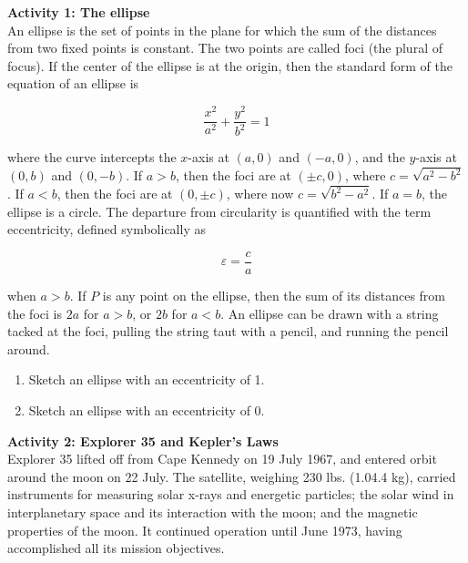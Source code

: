 {\noindent \bf Activity 1: The ellipse} \\

 An ellipse is the set of points in the plane for which the sum of the distances from two fixed points is constant. The two points are called foci (the plural of focus). If the center of the ellipse is at the origin, then the standard form of the equation of an ellipse is

\begin{equation} \frac{x^2}{a^2} + \frac{y^2}{b^2} = 1 \end{equation}

\noindent where the curve intercepts the $x$-axis at $(a,0)$ and $(-a,0)$, and the $y$-axis at $(0,b)$ and $(0,-b)$. If $a > b$, then the foci are at $(\pm c,0)$, where $c = \sqrt{a^2 - b^2}$. If $a < b$, then the foci are at $(0,\pm c)$, where now $c = \sqrt{b^2 - a^2}$. If $a = b$, the ellipse is a circle. The departure from circularity is quantified with the term eccentricity, defined symbolically as

\begin{equation} \varepsilon = \frac{c}{a} \end{equation}

\noindent when $a > b$. If $P$ is any point on the ellipse, then the sum of its distances from the foci is $2a$ for $a > b$, or $2b$ for $a < b$. An ellipse can be drawn with a string tacked at the foci, pulling the string taut with a pencil, and running the pencil around. \\

\begin{enumerate}

\item Sketch an ellipse with an eccentricity of 1.

\vskip35pt

\item Sketch an ellipse with an eccentricity of 0.

\vskip35pt

\end{enumerate}

{\noindent \bf Activity 2: Explorer 35 and Kepler's Laws}\\

 Explorer 35 lifted off from Cape Kennedy on 19 July 1967, and entered orbit around the moon on 22 July. The satellite, weighing 230 lbs. (1.04.4 kg), carried instruments for measuring solar x-rays and energetic particles; the solar wind in interplanetary space and its interaction with the moon; and the magnetic properties of the moon. It continued operation until June 1973, having accomplished all its mission objectives.

